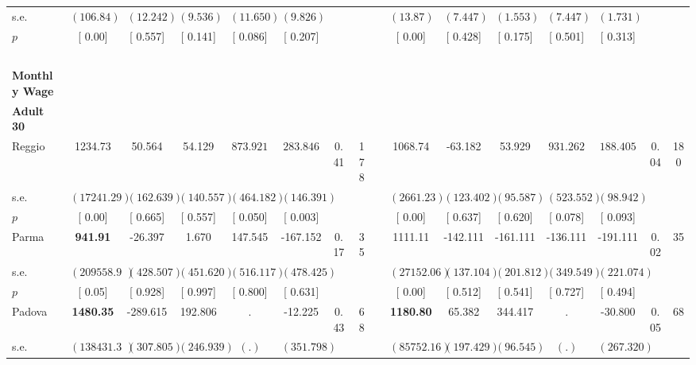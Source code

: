 \begin{longtable}{L{8em} c c c c c c c p{1em} c c c c c c c}
\quad \quad \quad \quad s.e.& $ (   106.84)$ & $ (   12.242)$ & $ (    9.536)$ & $ (   11.650)$ & $ (    9.826)$ & & & & $ (    13.87)$ & $ (    7.447)$ & $ (    1.553)$ & $ (    7.447)$ & $ (    1.731)$ & &  \\*
\quad \quad \quad \quad $ p$ & [     0.00] & [    0.557] & [    0.141] & [    0.086] & [    0.207] & & & & [     0.00] & [    0.428] & [    0.175] & [    0.501] & [    0.313] & &  \\[1em]
~\\[1em]
\textbf{Monthly Wage} \\*
\quad \quad \textbf{Adult 30} & & & & & & & & & & & & & & & \\* 
\quad \quad \quad Reggio& 1234.73 &    50.564 &    54.129 & $ \mathbf{  873.921}$ & $ \mathbf{  283.846}$ &      0.41 &       178 & & 1068.74 &   -63.182 &    53.929 & $ \mathbf{  931.262}$ & $ \mathbf{  188.405}$ &      0.04 &       180  \\*
\quad \quad \quad \quad s.e.& $ ( 17241.29)$ & $ (  162.639)$ & $ (  140.557)$ & $ (  464.182)$ & $ (  146.391)$ & & & & $ (  2661.23)$ & $ (  123.402)$ & $ (   95.587)$ & $ (  523.552)$ & $ (   98.942)$ & &  \\*
\quad \quad \quad \quad $ p$ & [     0.00] & [    0.665] & [    0.557] & [    0.050] & [    0.003] & & & & [     0.00] & [    0.637] & [    0.620] & [    0.078] & [    0.093] & &  \\[1em]
\quad \quad \quad Parma& \textbf{   941.91} &   -26.397 &     1.670 &   147.545 &  -167.152 &      0.17 &        35 & & 1111.11 &  -142.111 &  -161.111 &  -136.111 &  -191.111 &      0.02 &        35  \\*
\quad \quad \quad \quad s.e.& $ (209558.96)$ & $ (  428.507)$ & $ (  451.620)$ & $ (  516.117)$ & $ (  478.425)$ & & & & $ ( 27152.06)$ & $ (  137.104)$ & $ (  201.812)$ & $ (  349.549)$ & $ (  221.074)$ & &  \\*
\quad \quad \quad \quad $ p$ & [     0.05] & [    0.928] & [    0.997] & [    0.800] & [    0.631] & & & & [     0.00] & [    0.512] & [    0.541] & [    0.727] & [    0.494] & &  \\[1em]
\quad \quad \quad Padova& \textbf{  1480.35} &  -289.615 &   192.806 &         . &   -12.225 &      0.43 &        68 & & \textbf{  1180.80} &    65.382 &   344.417 &         . &   -30.800 &      0.05 &        68  \\*
\quad \quad \quad \quad s.e.& $ (138431.39)$ & $ (  307.805)$ & $ (  246.939)$ & $ (        .)$ & $ (  351.798)$ & & & & $ ( 85752.16)$ & $ (  197.429)$ & $ (   96.545)$ & $ (        .)$ & $ (  267.320)$ & &  \\*

\end{longtable}
